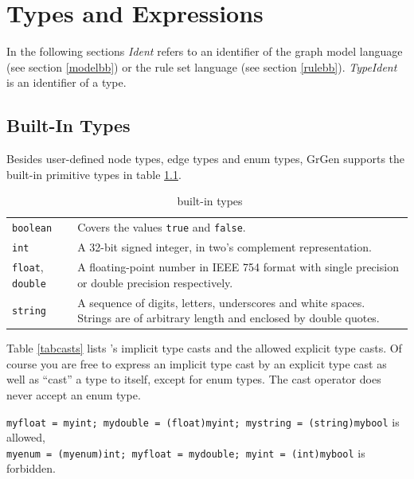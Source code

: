 \chapter{Types and Expressions}
\label{typeexpr}

In the following sections \emph{Ident} refers to an identifier of the graph model language (see section \ref{modelbb}) or the rule set language (see section \ref{rulebb}). \emph{TypeIdent} is an identifier of a type.

\section{Built-In Types}
\label{builtin}
Besides user-defined node types, edge types and enum types, GrGen supports the built-in primitive types in table \ref{builtintypes}.
\begin{table}[htbp]
\begin{tabularx}{\linewidth}{|l|X|}\hline
	\texttt{boolean} & Covers the values \texttt{true} and \texttt{false}. \\
	\texttt{int} & A 32-bit signed integer, in two's complement representation. \\
	\texttt{float}, \texttt{double} & A floating-point number in IEEE 754 format with single precision or double precision respectively. \\
	\texttt{string} & A sequence of digits, letters, underscores and white spaces. Strings are of arbitrary length and enclosed by double quotes.\\ \hline
\end{tabularx}
\caption{\GrG\ built-in types}
\label{builtintypes}
\end{table}
Table \ref{tabcasts} lists \GrG's implicit type casts and the allowed explicit type casts. Of course you are free to express an implicit type cast by an explicit type cast as well as ``cast'' a type to itself, except for enum types. The cast operator does never accept an enum type.
\begin{example}
  \texttt{myfloat = myint; mydouble = (float)myint; mystring = (string)mybool} is allowed, \\
  \texttt{myenum = (myenum)int; myfloat = mydouble; myint = (int)mybool} is forbidden.
\end{example}
